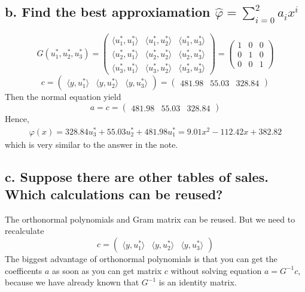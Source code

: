 \documentclass[twoside,a4paper]{article}
\begin{document}
\subsection*{b. Find the best approxiamation $\widehat{\varphi }=\sum_{i=0}^{2}a_ix^i$}
\[
G(u^*_1,u^*_2,u^*_3)= 
\begin{pmatrix}
\langle u^*_1,u^*_1 \rangle & \langle u^*_1,u^*_2 \rangle & \langle u^*_1,u^*_3 \rangle \\
\langle u^*_2,u^*_1 \rangle & \langle u^*_2,u^*_2 \rangle & \langle u^*_2,u^*_3 \rangle \\
\langle u_3^*,u_1^* \rangle & \langle u_3^*,u_2^* \rangle & \langle u_3^*,u_3^* \rangle 
\end{pmatrix} =
\begin{pmatrix}
1 & 0 & 0 \\
0 & 1 & 0 \\
0 & 0 & 1
\end{pmatrix}
\]
\[
c =
\begin{pmatrix}
\langle y,u^*_1 \rangle & \langle y,u^*_2 \rangle & \langle y,u^*_3 \rangle 
\end{pmatrix}=
\begin{pmatrix}
481.98 & 55.03 & 328.84
\end{pmatrix}
\]
Then the normal equation yield
\[
a = c=
\begin{pmatrix}
481.98 & 55.03 & 328.84
\end{pmatrix}
\]
Hence, 
\begin{gather}
\varphi(x)=328.84u_3^*+55.03u_2^*+481.98u_1^*=9.01x^2-112.42x+382.82
\end{gather}
which is very similar to the answer in the note.
\subsection*{c. Suppose there are other tables of sales. Which calculations can be reused?}
The orthonormal polynomials and Gram matrix can be reused. But we need to recalculate 
\[
c =
\begin{pmatrix}
\langle y,u^*_1 \rangle & \langle y,u^*_2 \rangle & \langle y,u^*_3 \rangle 
\end{pmatrix}
\]
The biggest advantage of orthonormal polynomials is that you can get the coefficents $a$ as soon as you can get matrix $c$ without solving equation $a=G^{-1}c$, because we have already known that $G^{-1}$ is an identity matrix.
\end{document}

